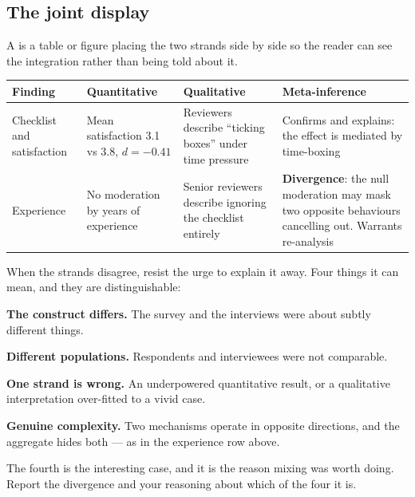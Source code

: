 \subsection{The joint display}

A  is a table or figure placing the two strands side by
side so the reader can see the integration rather than being told about it.

\begin{center}
\small
\begin{tabular}{@{}L{2.9cm}L{3.5cm}L{3.5cm}L{3.6cm}@{}}
\toprule
\textbf{Finding} & \textbf{Quantitative} & \textbf{Qualitative} & \textbf{Meta-inference} \\
\midrule
Checklist and satisfaction
  & Mean satisfaction 3.1 vs 3.8, $d = -0.41$
  & Reviewers describe ``ticking boxes'' under time pressure
  & Confirms and explains: the effect is mediated by time-boxing \\
Experience
  & No moderation by years of experience
  & Senior reviewers describe ignoring the checklist entirely
  & \textbf{Divergence}: the null moderation may mask two opposite behaviours
    cancelling out. Warrants re-analysis \\
\bottomrule
\end{tabular}
\end{center}

\begin{conceptbox}
When the strands disagree, resist the urge to explain it away. Four things it
can mean, and they are distinguishable:

\begin{tightnum}
  \item \textbf{The construct differs.} The survey and the interviews were
    about subtly different things.
  \item \textbf{Different populations.} Respondents and interviewees were not
    comparable.
  \item \textbf{One strand is wrong.} An underpowered quantitative result, or a
    qualitative interpretation over-fitted to a vivid case.
  \item \textbf{Genuine complexity.} Two mechanisms operate in opposite
    directions, and the aggregate hides both --- as in the experience row
    above.
\end{tightnum}

\medskip
The fourth is the interesting case, and it is the reason mixing was worth
doing. Report the divergence and your reasoning about which of the four it is.
\end{conceptbox}

